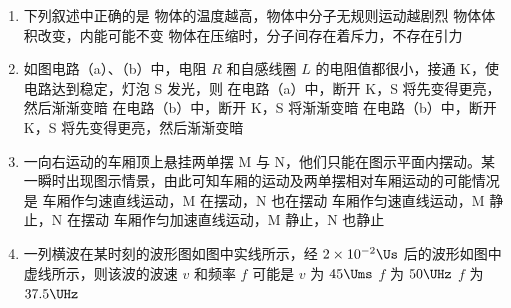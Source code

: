 \documentclass[\gkver]{gaokaozhenti}
\begin{document}
\begin{enumerate}
\item
下列叙述中正确的是
{物体的温度越高，物体中分子无规则运动越剧烈}
{物体体积改变，内能可能不变}
{物体在压缩时，分子间存在着斥力，不存在引力}

\item
如图电路（a）、（b）中，电阻 $R$ 和自感线圈 $L$ 的电阻值都很小，接通 K，使电路达到稳定，灯泡 S 发光，则
\onepicture[w=7cm]{}
{在电路（a）中，断开 K，S 将先变得更亮，然后渐渐变暗}
{在电路（b）中，断开 K，S 将渐渐变暗}
{在电路（b）中，断开 K，S 将先变得更亮，然后渐渐变暗}

\item
一向右运动的车厢顶上悬挂两单摆 M 与 N，他们只能在图示平面内摆动。某一瞬时出现图示情景，由此可知车厢的运动及两单摆相对车厢运动的可能情况是
\onepicture[w=5.5cm]{}
{车厢作匀速直线运动，M 在摆动，N 也在摆动}
{车厢作匀速直线运动，M 静止，N 在摆动}
{车厢作匀加速直线运动，M 静止，N 也静止}

\item
一列横波在某时刻的波形图如图中实线所示，经 $2 \times 10^{-2}\Us$ 后的波形如图中虚线所示，则该波的波速 $v$ 和频率 $f$ 可能是
\onepicture[w=8cm]{}
{$v$ 为 $45\Ums$}
{$f$ 为 $50\UHz$}
{$f$ 为 $37.5\UHz$}


\end{enumerate}
\end{document}

